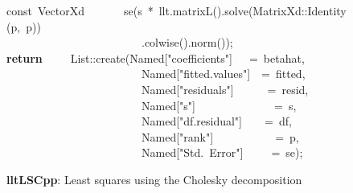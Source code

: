 \documentclass[shortnames,article]{jss}
\newcommand{\hlstd}[1]{\textcolor[rgb]{0,0,0}{#1}}
\newcommand{\hlopt}[1]{\textcolor[rgb]{0,0,0}{#1}}
\newcommand{\hlstr}[1]{\textcolor[rgb]{0.90,0.15,0.15}{#1}}
\newcommand{\hlkwa}[1]{\textcolor[rgb]{0.61,0.13,0.93}{\bf{#1}}}
\newcommand{\hlkwb}[1]{\textcolor[rgb]{0.13,0.54,0.13}{#1}}
\newcommand{\hlkwd}[1]{\textcolor[rgb]{0,0,0}{#1}}
\begin{document}
\begin{figure}[tbh]
  \hlstd{}\hlkwb{const\ }\hlstd{VectorXd}\hlstd{\ \ \ \ \ \ \ }\hlstd{}\hlkwd{se}\hlstd{}\hlopt{(}\hlstd{s\ }\hlopt{{*}\ }\hlstd{llt}\hlopt{.}\hlstd{}\hlkwd{matrixL}\hlstd{}\hlopt{().}\hlstd{}\hlkwd{solve}\hlstd{}\hlopt{(}\hlstd{MatrixXd}\hlopt{::}\hlstd{}\hlkwd{Identity}\hlstd{}\hlopt{(}\hlstd{p}\hlopt{,\ }\hlstd{p}\hlopt{))}\hspace*{\fill}\\
  \hlstd{}\hlstd{\ \ \ \ \ \ \ \ \ \ \ \ \ \ \ \ \ \ \ \ \ \ \ \ }\hlstd{}\hlopt{.}\hlstd{}\hlkwd{colwise}\hlstd{}\hlopt{().}\hlstd{}\hlkwd{norm}\hlstd{}\hlopt{());}\hspace*{\fill}\\
  \hlstd{}\hlkwa{return}\hlstd{\ \ \ \ \ }\hlkwa{}\hlstd{List}\hlopt{::}\hlstd{}\hlkwd{create}\hlstd{}\hlopt{(}\hlstd{Named}\hlopt{{[}}\hlstd{}\hlstr{"coefficients"}\hlstd{}\hlopt{{]}}\hlstd{\ \ \ }\hlopt{=\ }\hlstd{betahat}\hlopt{,}\hspace*{\fill}\\
  \hlstd{}\hlstd{\ \ \ \ \ \ \ \ \ \ \ \ \ \ \ \ \ \ \ \ \ \ \ \ }\hlstd{Named}\hlopt{{[}}\hlstd{}\hlstr{"fitted.values"}\hlstd{}\hlopt{{]}}\hlstd{\ \ }\hlopt{=\ }\hlstd{fitted}\hlopt{,}\hspace*{\fill}\\
  \hlstd{}\hlstd{\ \ \ \ \ \ \ \ \ \ \ \ \ \ \ \ \ \ \ \ \ \ \ \ }\hlstd{Named}\hlopt{{[}}\hlstd{}\hlstr{"residuals"}\hlstd{}\hlopt{{]}}\hlstd{\ \ \ \ \ \ }\hlopt{=\ }\hlstd{resid}\hlopt{,}\hspace*{\fill}\\
  \hlstd{}\hlstd{\ \ \ \ \ \ \ \ \ \ \ \ \ \ \ \ \ \ \ \ \ \ \ \ }\hlstd{Named}\hlopt{{[}}\hlstd{}\hlstr{"s"}\hlstd{}\hlopt{{]}}\hlstd{\ \ \ \ \ \ \ \ \ \ \ \ \ \ }\hlopt{=\ }\hlstd{s}\hlopt{,}\hspace*{\fill}\\
  \hlstd{}\hlstd{\ \ \ \ \ \ \ \ \ \ \ \ \ \ \ \ \ \ \ \ \ \ \ \ }\hlstd{Named}\hlopt{{[}}\hlstd{}\hlstr{"df.residual"}\hlstd{}\hlopt{{]}}\hlstd{\ \ \ \ }\hlopt{=\ }\hlstd{df}\hlopt{,}\hspace*{\fill}\\
  \hlstd{}\hlstd{\ \ \ \ \ \ \ \ \ \ \ \ \ \ \ \ \ \ \ \ \ \ \ \ }\hlstd{Named}\hlopt{{[}}\hlstd{}\hlstr{"rank"}\hlstd{}\hlopt{{]}}\hlstd{\ \ \ \ \ \ \ \ \ \ \ }\hlopt{=\ }\hlstd{p}\hlopt{,}\hspace*{\fill}\\
  \hlstd{}\hlstd{\ \ \ \ \ \ \ \ \ \ \ \ \ \ \ \ \ \ \ \ \ \ \ \ }\hlstd{Named}\hlopt{{[}}\hlstd{}\hlstr{"Std.\ Error"}\hlstd{}\hlopt{{]}}\hlstd{\ \ \ \ \ }\hlopt{=\ }\hlstd{se}\hlopt{);}\hlstd{}\hspace*{\fill}\\
  \mbox{}
  \normalfont
  \normalsize
  \caption{\textbf{lltLSCpp}: Least squares using the Cholesky decomposition}
  \label{lltLS}
\end{figure}
\end{document}
